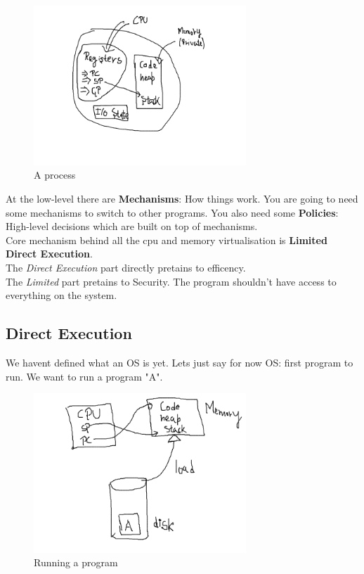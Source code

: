 \begin{figure}[h!]
    \begin{center}
        \includegraphics[width=8cm]{img/process.png}
        \caption{A process}
    \end{center}
\end{figure}

At the low-level there are \textbf{Mechanisms}:
How things work. You are
going to need some mechanisms to switch to other programs. You
also need some \textbf{Policies}:
High-level decisions which are built
on top of mechanisms.\\

Core mechanism behind all the cpu and memory virtualisation is
\textbf{Limited Direct Execution}.\\

The \textit{Direct Execution} part
directly pretains to efficency.\\

The \textit{Limited} part pretains to Security. The program
shouldn't have access to everything on the system.\\

\subsection{Direct Execution}

We havent defined what an OS is yet. Lets just say for now OS:
first program to run. We want to run a program "A".

\newpage

\begin{figure}[h!]
    \begin{center}
        \includegraphics[width=8cm]{img/runprogram.png}
        \caption{Running a program}
    \end{center}
\end{figure}

